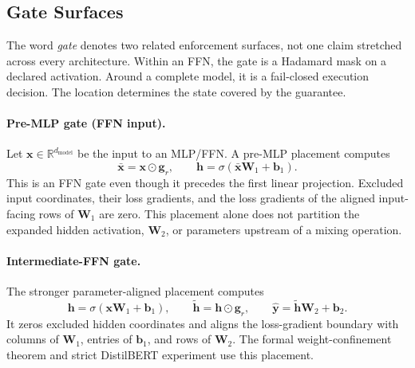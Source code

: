 \documentclass[11pt,a4paper]{article}
\newcommand{\R}{\mathbb{R}}
\newcommand{\bx}{\mathbf{x}}
\newcommand{\bh}{\mathbf{h}}
\newcommand{\bW}{\mathbf{W}}
\newcommand{\bg}{\mathbf{g}}
\begin{document}
\subsection{Gate Surfaces}
\label{sec:gate-surfaces}

The word \emph{gate} denotes two related enforcement surfaces, not one
claim stretched across every architecture.  Within an FFN, the gate is
a Hadamard mask on a declared activation.  Around a complete model, it
is a fail-closed execution decision.  The location determines the
state covered by the guarantee.

\paragraph{Pre-MLP gate (FFN input).}
Let $\bx\in\R^{d_{\mathrm{model}}}$ be the input to an MLP/FFN.  A
pre-MLP placement computes
\begin{equation}
\bar{\bx}=\bx\odot\bg_r,\qquad
\bh=\sigma(\bar{\bx}\bW_1+\mathbf b_1).
\label{eq:pre-mlp-gate}
\end{equation}
This is an FFN gate even though it precedes the first linear
projection.  Excluded input coordinates, their loss gradients, and
the loss gradients of the aligned input-facing rows of $\bW_1$ are
zero.  This placement alone does not partition the expanded hidden
activation, $\bW_2$, or parameters upstream of a mixing operation.

\paragraph{Intermediate-FFN gate.}
The stronger parameter-aligned placement computes
\begin{equation}
\bh=\sigma(\bx\bW_1+\mathbf b_1),\qquad
\tilde{\bh}=\bh\odot\bg_r,\qquad
\hat{\mathbf y}=\tilde{\bh}\bW_2+\mathbf b_2.
\label{eq:intermediate-ffn-gate}
\end{equation}
It zeros excluded hidden coordinates and aligns the loss-gradient
boundary with columns of $\bW_1$, entries of $\mathbf b_1$, and rows
of $\bW_2$.  The formal weight-confinement theorem and strict
DistilBERT experiment use this placement.
\end{document}
